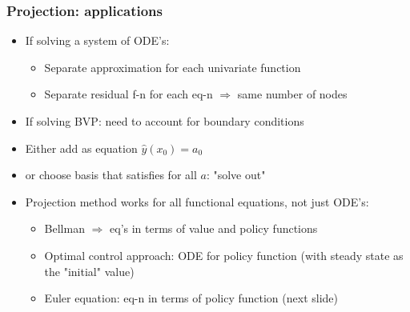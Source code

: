 \documentclass[bigger,handout]{beamer}
\begin{document}
 
\begin{frame}%
  
\frametitle{Projection: applications}

\begin{itemize}

\item If solving a system of ODE's:

\begin{itemize}
\item Separate approximation for each univariate function

\item Separate residual f-n for each eq-n $\Rightarrow $ same number of nodes
\end{itemize}

\item If solving BVP: need to account for boundary conditions
\item Either add as equation $\hat{y}(x_0)=a_0$
\item or choose basis that satisfies for all $a$: "solve out"

\item Projection method works for all functional equations, \newline
not just ODE's:

\begin{itemize}
\item Bellman $\Rightarrow $ eq's in terms of value and policy functions

\item Optimal control approach: ODE for policy function\newline
(with steady state as the "initial" value)

\item Euler equation: eq-n in terms of policy function (next slide)
\end{itemize}
\end{itemize}
  
 
\end{frame}%
  
 
 
\end{document}
